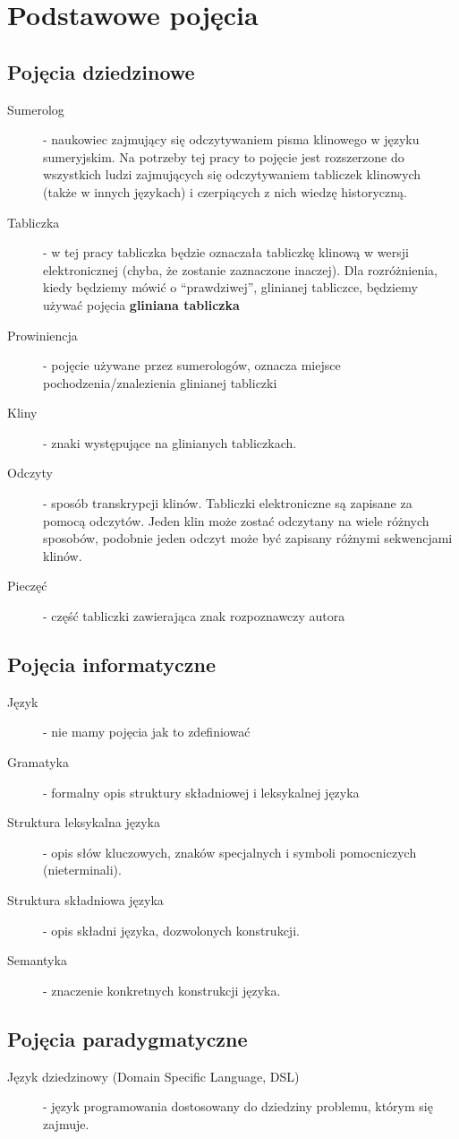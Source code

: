 \chapter{Podstawowe pojęcia}\label{r:pojecia}
\section{Pojęcia dziedzinowe}
\begin{description}
 \item[Sumerolog] - naukowiec zajmujący się odczytywaniem pisma klinowego w języku sumeryjskim. Na potrzeby tej pracy
		      to pojęcie jest rozszerzone do wszystkich ludzi zajmujących się odczytywaniem tabliczek klinowych (także w innych językach) i czerpiących z nich wiedzę historyczną.
 \item[Tabliczka] - w tej pracy tabliczka będzie oznaczała tabliczkę klinową w wersji elektronicznej 
		  (chyba, że zostanie zaznaczone inaczej). Dla rozróżnienia, kiedy będziemy mówić o ``prawdziwej'', 
		  glinianej tabliczce, będziemy używać pojęcia \textbf{gliniana tabliczka}
 \item[Prowiniencja] - pojęcie używane przez sumerologów, oznacza miejsce pochodzenia/znalezienia glinianej tabliczki
 \item[Kliny] - znaki występujące na glinianych tabliczkach.
 \item[Odczyty] - sposób transkrypcji klinów. Tabliczki elektroniczne są zapisane za pomocą odczytów. Jeden klin może zostać odczytany na wiele różnych sposobów, podobnie jeden odczyt może być zapisany różnymi sekwencjami klinów.
 \item[Pieczęć] - część tabliczki zawierająca znak rozpoznawczy autora
\end{description}

\section{Pojęcia informatyczne}
\begin{description}
 \item[Język] - nie mamy pojęcia jak to zdefiniować
 \item[Gramatyka] - formalny opis struktury składniowej i leksykalnej języka
 \item[Struktura leksykalna języka] - opis słów kluczowych, znaków specjalnych i symboli pomocniczych (nieterminali).
 \item[Struktura składniowa języka] - opis składni języka, dozwolonych konstrukcji.
 \item[Semantyka] - znaczenie konkretnych konstrukcji języka.
 \end{description}
\section{Pojęcia paradygmatyczne}
\begin{description}
 \item[Język dziedzinowy (Domain Specific Language, DSL)] - język programowania dostosowany do dziedziny problemu, którym się zajmuje. 
 \end{description}